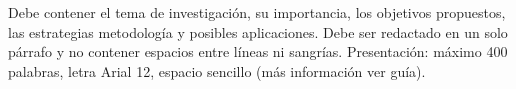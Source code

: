 \begin{resumen}
\noindent
Debe contener el tema de investigación, su importancia, los objetivos propuestos, las estrategias metodología y posibles aplicaciones. Debe ser redactado en un solo párrafo y no contener espacios entre líneas ni sangrías. Presentación: máximo 400  palabras, letra Arial 12, espacio sencillo (más información ver guía).

\end{resumen}
